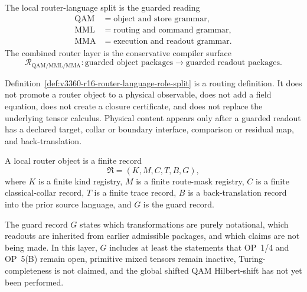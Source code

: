 \begin{definition}
\label{def:v3360-r16-router-language-role-split}
The local router-language split is the guarded reading
\[
\begin{aligned}
 \mathrm{QAM} &= \text{object and store grammar},\\
 \mathrm{MML} &= \text{routing and command grammar},\\
 \mathrm{MMA} &= \text{execution and readout grammar}.
\end{aligned}
\]
The combined router layer is the conservative compiler surface
\[
 \mathcal R_{\mathrm{QAM/MML/MMA}}
 :
 \text{guarded object packages}
 \longrightarrow
 \text{guarded readout packages}.
\]
\end{definition}

\begin{remark}
\label{rem:v3360-r16-machine-layer-is-not-physical-content}
Definition~\ref{def:v3360-r16-router-language-role-split} is a routing definition. It does not promote a router object to a physical observable, does not add a field equation, does not create a closure certificate, and does not replace the underlying tensor calculus. Physical content appears only after a guarded readout has a declared target, collar or boundary interface, comparison or residual map, and back-translation.
\end{remark}

\begin{definition}
\label{def:v3360-r16-router-object}
A local router object is a finite record
\[
 \mathfrak R=(K,M,C,T,B,G),
\]
where $K$ is a finite kind registry, $M$ is a finite route-mask registry, $C$ is a finite classical-collar record, $T$ is a finite trace record, $B$ is a back-translation record into the prior source language, and $G$ is the guard record.
\end{definition}

\begin{definition}
\label{def:v3360-r16-router-guard-record}
The guard record $G$ states which transformations are purely notational, which readouts are inherited from earlier admissible packages, and which claims are not being made. In this layer, $G$ includes at least the statements that OP~1/4 and OP~5(B) remain open, primitive mixed tensors remain inactive, Turing-completeness is not claimed, and the global shifted QAM Hilbert-shift has not yet been performed.
\end{definition}

